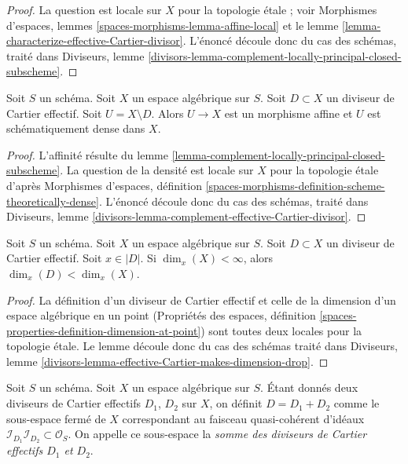 \begin{proof}
La question est locale sur $X$ pour la topologie \'etale ; voir
Morphismes d'espaces, lemmes \ref{spaces-morphisms-lemma-affine-local}
et le
lemme \ref{lemma-characterize-effective-Cartier-divisor}.
L'énoncé découle donc du cas des schémas, traité dans
Diviseurs, lemme
\ref{divisors-lemma-complement-locally-principal-closed-subscheme}.
\end{proof}

\begin{lemma}
\label{lemma-complement-effective-Cartier-divisor}
Soit $S$ un schéma. Soit $X$ un espace algébrique sur $S$.
Soit $D \subset X$ un diviseur de Cartier effectif.
Soit $U = X \setminus D$. Alors $U \to X$ est un morphisme affine et $U$
est schématiquement dense dans $X$.
\end{lemma}

\begin{proof}
L'affinité résulte du lemme \ref{lemma-complement-locally-principal-closed-subscheme}.
La question de la densité est locale sur $X$ pour la topologie \'etale d'après
Morphismes d'espaces, définition
\ref{spaces-morphisms-definition-scheme-theoretically-dense}.
L'énoncé découle donc du cas des schémas, traité dans
Diviseurs, lemme
\ref{divisors-lemma-complement-effective-Cartier-divisor}.
\end{proof}

\begin{lemma}
\label{lemma-effective-Cartier-makes-dimension-drop}
Soit $S$ un schéma. Soit $X$ un espace algébrique sur $S$.
Soit $D \subset X$ un diviseur de Cartier effectif.
Soit $x \in |D|$.
Si $\dim_x(X) < \infty$, alors $\dim_x(D) < \dim_x(X)$.
\end{lemma}

\begin{proof}
La définition d'un diviseur de Cartier effectif et celle de la
dimension d'un espace algébrique en un point
(Propriétés des espaces, définition
\ref{spaces-properties-definition-dimension-at-point})
sont toutes deux locales pour la topologie \'etale. Le lemme découle donc du cas des schémas
traité dans
Diviseurs, lemme \ref{divisors-lemma-effective-Cartier-makes-dimension-drop}.
\end{proof}

\begin{definition}
\label{definition-sum-effective-Cartier-divisors}
Soit $S$ un schéma. Soit $X$ un espace algébrique sur $S$.
Étant donnés deux diviseurs de Cartier effectifs
$D_1$, $D_2$ sur $X$, on définit $D = D_1 + D_2$ comme le
sous-espace fermé de $X$ correspondant au faisceau quasi-cohérent
d'idéaux
$\mathcal{I}_{D_1}\mathcal{I}_{D_2} \subset \mathcal{O}_S$.
On appelle ce sous-espace la {\it somme des diviseurs de Cartier effectifs
$D_1$ et $D_2$}.
\end{definition}

